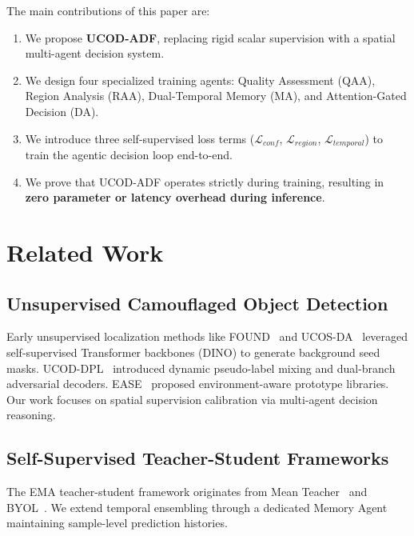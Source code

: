 \documentclass[journal,twoside,web]{IEEEtran}
\newcommand{\methodname}{UCOD-ADF}
\begin{document}
The main contributions of this paper are:
\begin{enumerate}
    \item We propose \textbf{\methodname{}}, replacing rigid scalar supervision with a spatial multi-agent decision system.
    \item We design four specialized training agents: Quality Assessment (QAA), Region Analysis (RAA), Dual-Temporal Memory (MA), and Attention-Gated Decision (DA).
    \item We introduce three self-supervised loss terms ($\mathcal{L}_{conf}$, $\mathcal{L}_{region}$, $\mathcal{L}_{temporal}$) to train the agentic decision loop end-to-end.
    \item We prove that \methodname{} operates strictly during training, resulting in \textbf{zero parameter or latency overhead during inference}.
\end{enumerate}

\section{Related Work}
\label{sec:related}

\subsection{Unsupervised Camouflaged Object Detection}
Early unsupervised localization methods like FOUND~\cite{found} and UCOS-DA~\cite{ucosda} leveraged self-supervised Transformer backbones (DINO) to generate background seed masks. UCOD-DPL~\cite{ucoddpl} introduced dynamic pseudo-label mixing and dual-branch adversarial decoders. EASE~\cite{ease} proposed environment-aware prototype libraries. Our work focuses on spatial supervision calibration via multi-agent decision reasoning.

\subsection{Self-Supervised Teacher-Student Frameworks}
The EMA teacher-student framework originates from Mean Teacher~\cite{meanteacher} and BYOL~\cite{byol}. We extend temporal ensembling through a dedicated Memory Agent maintaining sample-level prediction histories.

\end{document}
